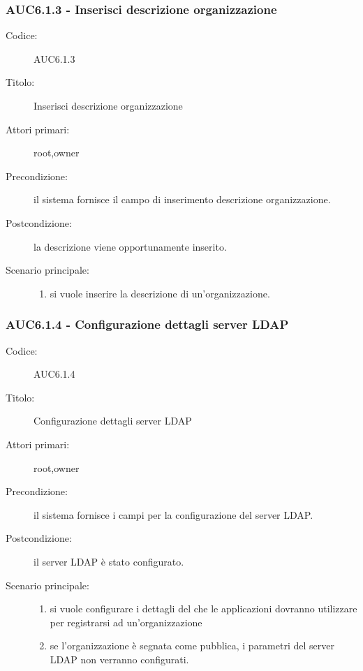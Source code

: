 \documentclass[casi-duso]{subfiles}
\begin{document}
  \subsubsection{AUC6.1.3 - Inserisci descrizione organizzazione}%
  \label{subsub:AUC6.1.3}
  \begin{description}
    \item[Codice:] AUC6.1.3
    \item[Titolo:] Inserisci descrizione organizzazione
    \item[Attori primari:] root,owner
    \item[Precondizione:] il sistema fornisce il campo di inserimento descrizione organizzazione.
    \item[Postcondizione:] la descrizione viene opportunamente inserito.
    \item[Scenario principale:]
    \begin{enumerate}
      \item si vuole inserire la descrizione di un'organizzazione.
    \end{enumerate}
  \end{description}

  \subsubsection{AUC6.1.4 - Configurazione dettagli server LDAP}%
  \label{subsub:AUC6.1.4}
  \begin{description}
    \item[Codice:] AUC6.1.4
    \item[Titolo:] Configurazione dettagli server LDAP
    \item[Attori primari:] root,owner
    \item[Precondizione:] il sistema fornisce i campi per la configurazione del server LDAP.
    \item[Postcondizione:] il server LDAP è stato configurato.
    \item[Scenario principale:]
    \begin{enumerate}
      \item si vuole configurare i dettagli del  che le applicazioni dovranno utilizzare per registrarsi ad un'organizzazione
      \item se l'organizzazione è segnata come pubblica, i parametri del server LDAP non verranno configurati.
    \end{enumerate}
  \end{description}
\end{document}
